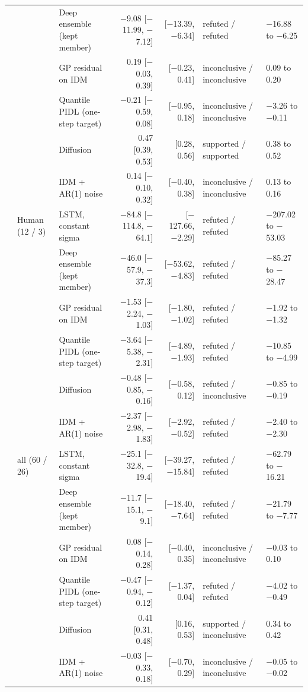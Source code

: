\begin{longtable}{lllrrll}
 &  & Deep ensemble (kept member) & $-$9.08 [$-$11.99, $-$7.12] & [$-$13.39, $-$6.34] & refuted / refuted & $-$16.88 to $-$6.25 \\
 &  & GP residual on IDM & 0.19 [$-$0.03, 0.39] & [$-$0.23, 0.41] & inconclusive / inconclusive & 0.09 to 0.20 \\
 &  & Quantile PIDL (one-step target) & $-$0.21 [$-$0.59, 0.08] & [$-$0.95, 0.18] & inconclusive / inconclusive & $-$3.26 to $-$0.11 \\
 &  & Diffusion & 0.47 [0.39, 0.53] & [0.28, 0.56] & supported / supported & 0.38 to 0.52 \\
 &  & IDM + AR(1) noise & 0.14 [$-$0.10, 0.32] & [$-$0.40, 0.38] & inconclusive / inconclusive & 0.13 to 0.16 \\
\midrule
 & Human (12 / 3) & LSTM, constant sigma & $-$84.8 [$-$114.8, $-$64.1] & [$-$127.66, $-$2.29] & refuted / refuted & $-$207.02 to $-$53.03 \\
 &  & Deep ensemble (kept member) & $-$46.0 [$-$57.9, $-$37.3] & [$-$53.62, $-$4.83] & refuted / refuted & $-$85.27 to $-$28.47 \\
 &  & GP residual on IDM & $-$1.53 [$-$2.24, $-$1.03] & [$-$1.80, $-$1.02] & refuted / refuted & $-$1.92 to $-$1.32 \\
 &  & Quantile PIDL (one-step target) & $-$3.64 [$-$5.38, $-$2.31] & [$-$4.89, $-$1.93] & refuted / refuted & $-$10.85 to $-$4.99 \\
 &  & Diffusion & $-$0.48 [$-$0.85, $-$0.16] & [$-$0.58, 0.12] & refuted / inconclusive & $-$0.85 to $-$0.19 \\
 &  & IDM + AR(1) noise & $-$2.37 [$-$2.98, $-$1.83] & [$-$2.92, $-$0.52] & refuted / refuted & $-$2.40 to $-$2.30 \\
\midrule
 & all (60 / 26) & LSTM, constant sigma & $-$25.1 [$-$32.8, $-$19.4] & [$-$39.27, $-$15.84] & refuted / refuted & $-$62.79 to $-$16.21 \\
 &  & Deep ensemble (kept member) & $-$11.7 [$-$15.1, $-$9.1] & [$-$18.40, $-$7.64] & refuted / refuted & $-$21.79 to $-$7.77 \\
 &  & GP residual on IDM & 0.08 [$-$0.14, 0.28] & [$-$0.40, 0.35] & inconclusive / inconclusive & $-$0.03 to 0.10 \\
 &  & Quantile PIDL (one-step target) & $-$0.47 [$-$0.94, $-$0.12] & [$-$1.37, 0.04] & refuted / refuted & $-$4.02 to $-$0.49 \\
 &  & Diffusion & 0.41 [0.31, 0.48] & [0.16, 0.53] & supported / inconclusive & 0.34 to 0.42 \\
 &  & IDM + AR(1) noise & $-$0.03 [$-$0.33, 0.18] & [$-$0.70, 0.29] & inconclusive / inconclusive & $-$0.05 to $-$0.02 \\
\end{longtable}
\endgroup
